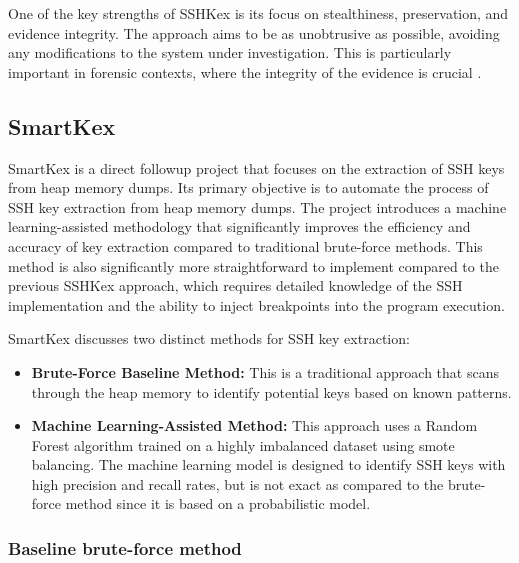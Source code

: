     One of the key strengths of SSHKex is its focus on stealthiness, preservation, and evidence integrity. The approach aims to be as unobtrusive as possible, avoiding any modifications to the system under investigation. This is particularly important in forensic contexts, where the integrity of the evidence is crucial \cite{SSHkex22}.

    \subsection{SmartKex}

    SmartKex is a direct followup project that focuses on the extraction of SSH keys from heap memory dumps. Its primary objective is to automate the process of SSH key extraction from heap memory dumps. The project introduces a machine learning-assisted methodology that significantly improves the efficiency and accuracy of key extraction compared to traditional brute-force methods. This method is also significantly more straightforward to implement compared to the previous SSHKex approach, which requires detailed knowledge of the SSH implementation and the ability to inject breakpoints into the program execution.

    SmartKex discusses two distinct methods for SSH key extraction:
    \begin{itemize}
        \item \textbf{Brute-Force Baseline Method:} This is a traditional approach that scans through the heap memory to identify potential keys based on known patterns.
        \item \textbf{Machine Learning-Assisted Method:} This  approach uses a Random Forest algorithm trained on a highly imbalanced dataset using \acrshort{smote} balancing. The machine learning model is designed to identify SSH keys with high precision and recall rates, but is not exact as compared to the brute-force method since it is based on a probabilistic model.
    \end{itemize}

        \subsubsection{Baseline brute-force method}

